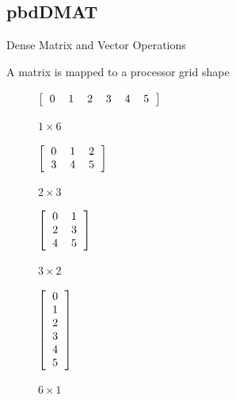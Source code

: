 \subsection{pbdDMAT}
\makesubcontentsslidessec

\begin{frame}{Dense Matrix and Vector Operations}
  \begin{block}{A matrix is mapped to a processor grid shape}
    \begin{table}[ht]
      \centering
      \begin{subfigure}[b]{0.23\textwidth}
        \centering
        $\left[\begin{tabular}{llllll}
            0 & 1 & 2 & 3 & 4 & 5
          \end{tabular}\right]$
        \vspace{1.5cm}
        \caption{$1\times 6$}
      \end{subfigure}%
      \begin{subfigure}[b]{0.23\textwidth}
        \centering
        $\left[\begin{tabular}{lll}
            0 & 1 & 2\\
            3 & 4 & 5
          \end{tabular}\right]$
        \caption{$2\times 3$}
      \end{subfigure}%
      \begin{subfigure}[b]{0.23\textwidth}
        \centering
        $\left[\begin{tabular}{ll}
            0 & 1 \\
            2 & 3\\
            4 & 5
          \end{tabular}\right]$
        \caption{$3\times 2$}
      \end{subfigure}
      \begin{subfigure}[b]{0.23\textwidth}
        \centering
        $\left[\begin{tabular}{l}
            0 \\ 1 \\ 2 \\ 3 \\ 4 \\ 5
          \end{tabular}\right]$
        \caption{$6\times 1$}
      \end{subfigure}
      \caption{Processor Grid Shapes with 6 Processors}\label{fig:gridshapes}
    \end{table}
  \end{block}
\end{frame}

